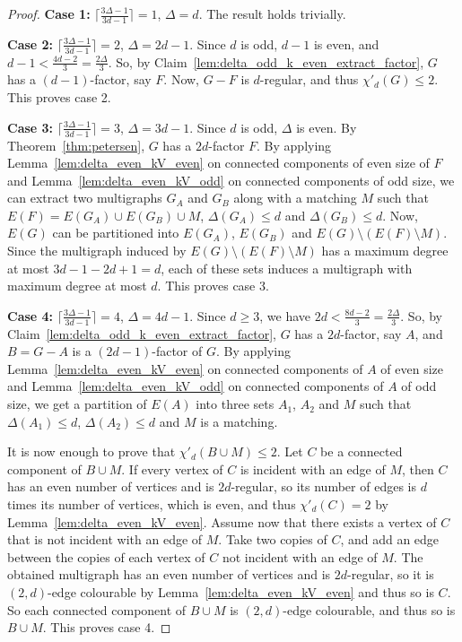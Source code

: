 \begin{proof}
\textbf{Case 1:} $\lceil \frac{3\Delta - 1}{3d - 1} \rceil = 1$, $\Delta = d$. The result holds trivially. 
\smallskip

\textbf{Case 2:}\label{case:delta_two_d_minus_one} 
$\lceil \frac{3\Delta - 1}{3d - 1} \rceil = 2$, $\Delta = 2d - 1$. 
Since $d$ is odd, $d-1$ is even, and $d-1 < \frac{4d-2}{3}=\frac{2\Delta}{3}$. 
So, by Claim~\ref{lem:delta_odd_k_even_extract_factor}, $G$ has a $(d-1)$-factor, say $F$.  
Now, $G-F$ is $d$-regular, 
and thus $\chi'_{d}(G) \leq 2$. This proves case 2. 
\smallskip

\textbf{Case 3:}\label{case:delta_three_d_minus_one} 
$\lceil \frac{3\Delta - 1}{3d - 1} \rceil = 3$, $\Delta = 3d - 1$. 
Since $d$ is odd, $\Delta$ is even. 
By Theorem~\ref{thm:petersen}, $G$ has a $2d$-factor $F$. 
By applying Lemma~\ref{lem:delta_even_kV_even} on connected components of even size of $F$ and Lemma~\ref{lem:delta_even_kV_odd} on connected components of odd size, we can extract two multigraphs  $G_{A}$ and $G_{B}$ along with a matching $M$ such that $E(F) = E(G_A) \cup E(G_B) \cup M$, $\Delta(G_{A}) \leq d$ and $\Delta(G_{B}) \leq d$. 
Now, $E(G)$ can be partitioned into $E(G_A)$, $E(G_B)$ and $E(G) \setminus (E(F) \setminus M)$. 
Since the multigraph induced by $E(G) \setminus (E(F) \setminus M)$ has a maximum degree at most $3d-1 - 2d + 1 = d$,  each of these sets  induces a multigraph with maximum degree at most $d$. This proves case 3. 
\smallskip

\textbf{Case 4:} 
$\lceil \frac{3\Delta - 1}{3d - 1} \rceil = 4$, $\Delta = 4d - 1$. 
Since $d \geq 3$, we have $2d < \frac{8d-2}{3}= \frac{2\Delta}{3}$. 
So, by Claim~\ref{lem:delta_odd_k_even_extract_factor}, $G$ has a $2d$-factor, say $A$, and $B = G-A$ is a $(2d-1)$-factor of $G$.  
By applying Lemma~\ref{lem:delta_even_kV_even} on connected components of $A$ of even size and Lemma~\ref{lem:delta_even_kV_odd} on connected components of $A$ of odd size, we get a partition of $E(A)$ into three sets $A_1$, $A_2$ and $M$ such that $\Delta(A_{1}) \leq d$, $\Delta(A_{2}) \leq d$ and $M$ is a matching. 

It is now enough to prove that $\chi'_{d}(B \cup M) \leq 2$. Let $C$ be a connected component of $B \cup M$. 
If every vertex of $C$ is incident with an edge of $M$, then $C$ has an even number of vertices and is $2d$-regular, so its number of edges is $d$ times its number of vertices, which is even, and thus $\chi'_d(C) = 2$ by Lemma~\ref{lem:delta_even_kV_even}. 
Assume now that there exists a vertex of $C$ that is not incident with an edge of $M$. Take two copies of $C$, and add an edge between the copies of each vertex of $C$ not incident with an edge of $M$. The obtained multigraph has an even number of vertices and is $2d$-regular, so it is $(2,d)$-edge colourable by Lemma~\ref{lem:delta_even_kV_even} and thus so is $C$. So each connected component of $B \cup M$ is $(2,d)$-edge colourable, and thus so is $B \cup M$. This proves case 4.
\smallskip


\end{proof}
